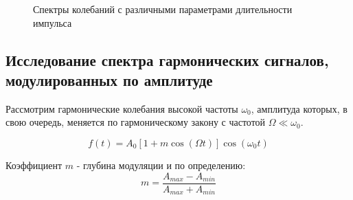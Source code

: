 \documentclass[a4paper, 12pt]{article}
\begin{document}
\begin{figure}[H]
\begin{minipage}[h]{0.49\linewidth}
\end{minipage}
\hfill
\begin{minipage}[h]{0.49\linewidth}
\end{minipage}
\caption{Спектры колебаний с различными параметрами длительности импульса}
\label{ris:image1}
\end{figure}


\subsection*{Исследование спектра гармонических сигналов, модулированных по амплитуде}

Рассмотрим гармонические колебания высокой частоты $\omega_0$, амплитуда которых, в свою очередь, меняется по гармоническому закону с частотой $\Omega \ll \omega_0$.

\begin{equation}
\label{form:amf(t)_a_n}
	f(t) = A_0[1+m\cos(\Omega t)]\cos(\omega_0t)
\end{equation}

Коэффициент $m$ - глубина модуляции и по определению:
\begin{equation}
\label{form:m}
	m = \frac{A_{max}-A_{min}}{A_{max}+A_{min}}
\end{equation}
\end{document}
